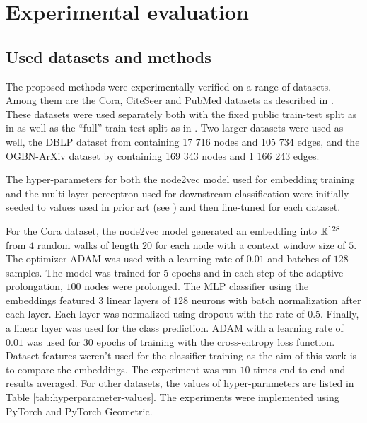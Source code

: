 \section{Experimental evaluation}

\subsection{Used datasets and methods}

The proposed methods were experimentally verified on a range of datasets. Among them are the Cora, CiteSeer and PubMed datasets as described in \cite{yang_revisiting_2016}. These datasets were used separately both with the fixed public train-test split as in \cite{yang_revisiting_2016} as well as the \enquote{full} train-test split as in \cite{chen_fastgcn_2018}. Two larger datasets were used as well, the DBLP dataset from \cite{bojchevski_deep_2018} containing 17 716 nodes and 105 734 edges, and the OGBN-ArXiv dataset by \cite{hu_open_2021} containing 169 343 nodes and 1 166 243 edges.

The hyper-parameters for both the node2vec model used for embedding training and the multi-layer perceptron used for downstream classification were initially seeded to values used in prior art (see \cite{fey_fast_2019, hu_open_2021}) and then fine-tuned for each dataset.

For the Cora dataset, the node2vec model generated an embedding into \( \mathbb{R}^{128} \) from \( 4 \) random walks of length \( 20 \) for each node with a context window size of \( 5 \). The optimizer ADAM \cite{kingma_adam:_2017} was used with a learning rate of \( 0.01 \) and batches of \( 128 \) samples. The model was trained for \( 5 \) epochs and in each step of the adaptive prolongation, \( 100 \) nodes were prolonged. The MLP classifier using the embeddings featured \( 3 \) linear layers of \( 128 \) neurons with batch normalization after each layer. Each layer was normalized using dropout \cite{srivastava_dropout_2014} with the rate of \( 0.5 \). Finally, a linear layer was used for the class prediction. ADAM with a learning rate of \( 0.01 \)  was used for \( 30 \) epochs of training with the cross-entropy loss function. Dataset features weren't used for the classifier training as the aim of this work is to compare the embeddings. The experiment was run \( 10 \) times end-to-end and results averaged. For other datasets, the values of hyper-parameters are listed in Table \ref{tab:hyperparameter-values}. The experiments were implemented using PyTorch \cite{paszke_pytorch_2019} and PyTorch Geometric\cite{fey_fast_2019}.

